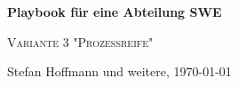 \begin{titlepage}
	\centering
	\vspace*{5cm}
	{\huge\bfseries Playbook für eine Abteilung SWE\par}
	{\scshape\LARGE Variante 3 "Prozessreife"\par}
	\vspace{2cm}
	{\Large\itshape \par}
	\vfill
	{\large Stefan Hoffmann und weitere, \today\par}
\end{titlepage}
